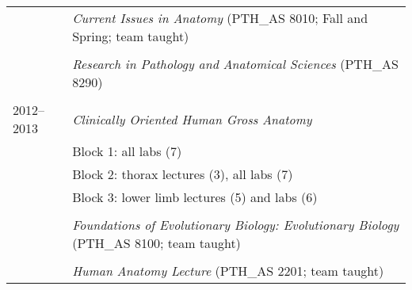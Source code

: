 \begin{longtable}{@{}lX@{}}
    \\
    & \textit{Current Issues in Anatomy} (PTH\_AS 8010; Fall and Spring; team taught)\\
    \\
    & \textit{Research in Pathology and Anatomical Sciences} (PTH\_AS 8290)\\
    \\
    2012--2013 & \textit{Clinically Oriented Human Gross Anatomy}\\
    & Block 1: all labs (7)\\
    & Block 2: thorax lectures (3), all labs (7)\\
    & Block 3: lower limb lectures (5) and labs (6)\\
    \\
    & \textit{Foundations of Evolutionary Biology: Evolutionary Biology} (PTH\_AS 8100; team taught)\\
    \\
    & \textit{Human Anatomy Lecture} (PTH\_AS 2201; team taught)\\
\end{longtable}
